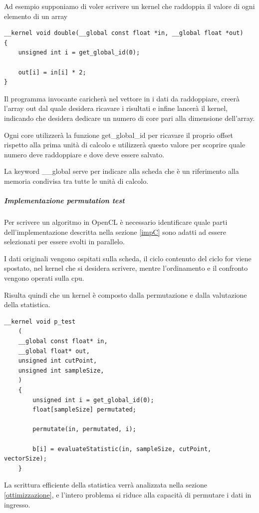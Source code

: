 Ad esempio supponiamo di voler scrivere un kernel che raddoppia il valore di ogni elemento di un array


\begin{lstlisting}[style=CStyle]
__kernel void double(__global const float *in, __global float *out)
{
	unsigned int i = get_global_id(0);
	
	out[i] = in[i] * 2;
}
\end{lstlisting}

Il programma invocante caricherà nel vettore in i dati da raddoppiare, creerà l'array out dal quale desidera ricavare i risultati e infine lancerà il kernel, indicando che desidera dedicare un numero di core pari alla dimensione dell'array.

Ogni core utilizzerà la funzione get\_global\_id per ricavare il proprio offset rispetto alla prima unità di calcolo e utilizzerà questo valore per scoprire quale numero deve raddoppiare e dove deve essere salvato.

La keyword \_\_global serve per indicare alla scheda che è un riferimento alla memoria condivisa tra tutte le unità di calcolo. 

\subparagraph{Implementazione permutation test}
Per scrivere un algoritmo in OpenCL è necessario identificare quale parti dell'implementazione descritta nella sezione \ref{impC} sono adatti ad essere selezionati per essere svolti in parallelo.

I dati originali vengono ospitati sulla scheda, il ciclo contenuto del ciclo for viene spostato, nel kernel che si desidera scrivere, mentre l'ordinamento e il confronto vengono operati sulla cpu.


Risulta quindi che un kernel è composto dalla permutazione e dalla valutazione della statistica. 

\begin{lstlisting}[style=CStyle]
	__kernel void p_test
	(
	__global const float* in,
	__global float* out,
	unsigned int cutPoint,
	unsigned int sampleSize,
	)
	{
		unsigned int i = get_global_id(0);
		float[sampleSize] permutated;
		
		permutate(in, permutated, i);
		
		b[i] = evaluateStatistic(in, sampleSize, cutPoint, vectorSize);
	}
\end{lstlisting}

La scrittura efficiente della statistica verrà analizzata nella sezione \ref{ottimizzazione}, e l'intero problema si riduce alla capacità di permutare i dati in ingresso.

